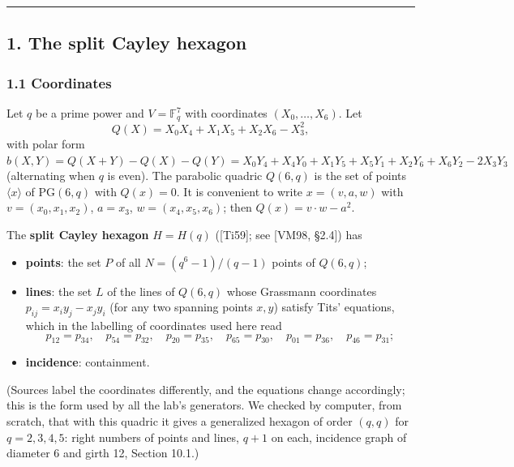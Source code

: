 \documentclass[
  11pt,
]{article}
\providecommand{\tightlist}{%
  \setlength{\itemsep}{0pt}\setlength{\parskip}{0pt}}
\begin{document}
\begin{center}\rule{0.5\linewidth}{0.5pt}\end{center}

\hypertarget{the-split-cayley-hexagon}{%
\subsection{1. The split Cayley hexagon}\label{the-split-cayley-hexagon}}

\hypertarget{coordinates}{%
\subsubsection{1.1 Coordinates}\label{coordinates}}

Let \(q\) be a prime power and \(V = \mathbb F_q^7\) with coordinates \((X_0,\dots,X_6)\). Let
\[Q(X) = X_0X_4 + X_1X_5 + X_2X_6 - X_3^2,\] with polar form
\(b(X,Y) = Q(X+Y)-Q(X)-Q(Y) = X_0Y_4+X_4Y_0+X_1Y_5+X_5Y_1+X_2Y_6+X_6Y_2-2X_3Y_3\) (alternating when \(q\) is even). The
parabolic quadric \(Q(6,q)\) is the set of points \(\langle x\rangle\) of \(\mathrm{PG}(6,q)\) with \(Q(x)=0\). It is
convenient to write \(x = (v, a, w)\) with \(v = (x_0,x_1,x_2)\), \(a = x_3\), \(w = (x_4,x_5,x_6)\); then
\(Q(x) = v\cdot w - a^2\).

The \textbf{split Cayley hexagon} \(H = H(q)\) ({[}Ti59{]}; see {[}VM98, §2.4{]}) has

\begin{itemize}
\tightlist
\item
  \textbf{points}: the set \(P\) of all \(N = (q^6-1)/(q-1)\) points of \(Q(6,q)\);
\item
  \textbf{lines}: the set \(L\) of the lines of \(Q(6,q)\) whose Grassmann coordinates \(p_{ij} = x_iy_j - x_jy_i\) (for
  any two spanning points \(x, y\)) satisfy Tits' equations, which in the labelling of coordinates used here read
  \[p_{12} = p_{34},\quad p_{54} = p_{32},\quad p_{20} = p_{35},\quad p_{65} = p_{30},\quad p_{01} = p_{36},\quad p_{46} = p_{31};\]
\item
  \textbf{incidence}: containment.
\end{itemize}

(Sources label the coordinates differently, and the equations change accordingly; this is the form used by all the lab's
generators. We checked by computer, from scratch, that with this quadric it gives a generalized hexagon of order
\((q,q)\) for \(q = 2, 3, 4, 5\): right numbers of points and lines, \(q+1\) on each, incidence graph of diameter 6 and
girth 12, Section 10.1.)
\end{document}
